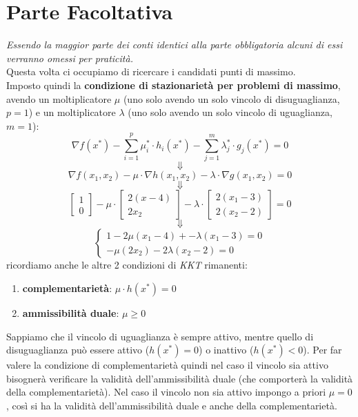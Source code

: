 \documentclass[a4paper,12pt, oneside]{book}
\begin{document}
\section{Parte Facoltativa}
\textit{Essendo la maggior parte dei conti identici alla parte
  obbligatoria alcuni di essi verranno omessi per praticità.}\\
Questa volta ci occupiamo di ricercare i candidati punti di
massimo. \\
Imposto quindi la \textbf{condizione di stazionarietà per problemi di
  massimo}, avendo un moltiplicatore $\mu$ (uno solo avendo un solo
vincolo di disuguaglianza, $p=1$) e un moltiplicatore $\lambda$ (uno solo
avendo un solo vincolo di uguaglianza, $m=1$):
\[\nabla f(x^*)-\sum_{i=1}^p\mu_i^*\cdot
  h_i(x^*)-\sum_{j=1}^m\lambda_j^*\cdot g_j(x^*)=0\]
\[\Downarrow\]
\[\nabla f(x_1,x_2)-\mu\cdot\nabla h(x_1,x_2)-\lambda\cdot\nabla
  g(x_1,x_2)=0\]
\[\Downarrow\]
\[\left[
    \begin{matrix}
      1\\
      0
    \end{matrix}
  \right]-\mu\cdot \left[
    \begin{matrix}
      2(x-4)\\
      2x_2
    \end{matrix}
  \right]-\lambda\cdot \left[
    \begin{matrix}
      2(x_1-3)\\
      2(x_2-2)
    \end{matrix}
  \right]=0
\]
\[\Downarrow\]
\[
  \begin{cases}
    1-2\mu(x_1-4)+-\lambda(x_1-3)=0\\
    -\mu(2x_2)-2\lambda(x_2-2)=0
  \end{cases}
\]
ricordiamo anche le altre 2 condizioni di \textit{KKT} rimanenti:
\begin{enumerate}
  \item \textbf{complementarietà}: $\mu\cdot h(x^*)=0$
  \item \textbf{ammissibilità duale}: $\mu\geq 0$
\end{enumerate}
Sappiamo che il vincolo di uguaglianza è sempre attivo, mentre quello
di disuguaglianza può essere attivo ($h(x^*)=0$) o inattivo
($h(x^*)<0$). Per far valere la condizione di complementarietà quindi
nel caso il vincolo sia attivo bisognerà verificare la validità
dell'ammissibilità duale (che comporterà la validità della
complementarietà). Nel caso il vincolo non sia attivo impongo a
priori $\mu=0$, così si ha la validità dell'ammissibilità duale e
anche della complementarietà.
\end{document}

